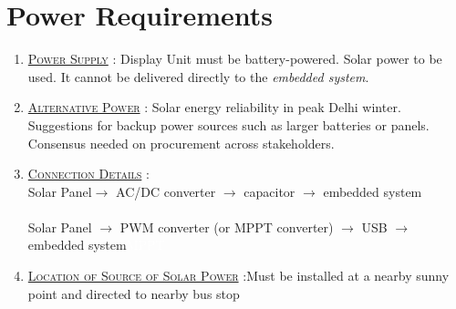 \section{Power Requirements}

\begin{enumerate}
    \item {}\underline{\textsc{Power Supply}} : Display Unit must be battery-powered. Solar power to be used. It cannot be delivered directly to the \textit{\gls{embedded system}}.

    \item \underline{\textsc{Alternative Power}} : Solar energy reliability in peak Delhi winter. Suggestions for backup power sources such as larger batteries or panels. Consensus needed on procurement across stakeholders.

    \item \underline{\textsc{Connection Details}} : \\Solar Panel$\to$ AC/\ac{DC} converter $\to$ capacitor $\to$ \gls{embedded system} \\ \\
          Solar Panel $\to$ \gls{PWM converter} (or \gls{MPPT converter}) $\to$ \gls{USB} $\to$ \Gls{embedded system}{\tiny \textcolor{white}{\ac{MPPT}}}

    \item \underline{\textsc{Location of Source of Solar Power}} :Must be installed at a nearby sunny point and directed to nearby bus stop
\end{enumerate}